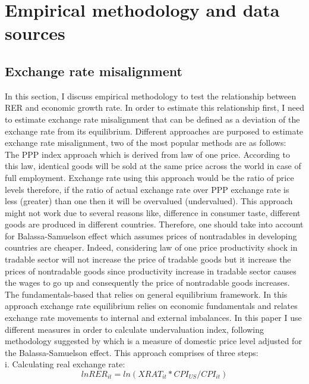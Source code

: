 \documentclass{article}
\begin{document}
\section{Empirical methodology and data sources}
\subsection{Exchange rate misalignment}
In this section, I discuss empirical methodology to test the relationship between RER and economic growth rate. In order to estimate this relationship first, I need to estimate exchange rate misalignment that can be defined as a deviation of the exchange rate from its equilibrium. Different approaches are purposed to estimate exchange rate misalignment, two of the most popular methods are as follows:\\
The PPP index approach which is derived from law of one price. According to this law, identical goods will be sold at the same price across the world in case of full employment. Exchange rate using this approach would be the ratio of price levels therefore, if the ratio of actual exchange rate over PPP exchange rate is less (greater) than one then it will be overvalued (undervalued). This approach might not work due to several reasons like, difference in consumer taste, different goods are produced in different countries. Therefore, one should take into account for Balassa-Samuelson effect which assumes prices of nontradables in developing countries are cheaper. Indeed, considering law of one price productivity shock in tradable sector will not increase the price of tradable goods but it increase the prices of nontradable goods since productivity increase in tradable sector causes the wages to go up and consequently the price of nontradable goods increases.\cite{couharde2013currency} The fundamentals-based that relies on general equilibrium framework. In this approach exchange rate equilibrium relies on economic fundamentals and relates exchange rate movements to internal and external imbalances.
In this paper I use different measures in order to calculate undervaluation index, following methodology suggested by \cite{rodrik2008real} which is a measure of domestic price level adjusted for the Balassa-Samuelson effect. This approach comprises of three steps:\\
i. Calculating real exchange rate:\\
\begin{equation}
lnRER_{it} = ln(XRAT_{it} *CPI_{US} / CPI_{it})
\end{equation}
\end{document}
